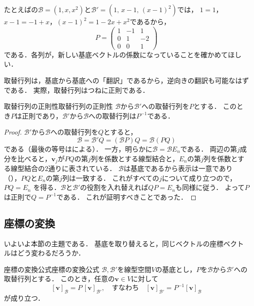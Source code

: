 たとえばの$\mathcal{B}=(1,x,x^2)$と$\mathcal{B}'=(1,\,x-1,\,(x-1)^2)$では，
$1=1$，$x-1=-1+x$，$(x-1)^2=1-2x+x^2$であるから，
\[
  P=\begin{pmatrix} 1 & -1 & 1 \\ 0 & 1 & -2 \\ 0 & 0 & 1 \end{pmatrix}
\]
である．各列が，新しい基底ベクトルの係数になっていることを確かめてほしい．

取替行列は，基底から基底への「翻訳」であるから，逆向きの翻訳も可能なはずである．
実際，取替行列はつねに正則である．

\begin{prop}{取替行列の正則性}{取替行列の正則性}
  $\mathcal{B}$から$\mathcal{B}'$への取替行列を$P$とする．
  このとき$P$は正則であり，$\mathcal{B}'$から$\mathcal{B}$への取替行列は$P^{-1}$である．
\end{prop}

\begin{tleftbar}
\begin{proof}
  $\mathcal{B}'$から$\mathcal{B}$への取替行列を$Q$とすると，
  \[
    \mathcal{B} = \mathcal{B}' Q = (\mathcal{B}P)Q = \mathcal{B}(PQ)
  \]
  である（最後の等号はによる）．
  一方，明らかに$\mathcal{B} = \mathcal{B}E_n$である．
  両辺の第$j$成分を比べると，$\bm{v}_j$が$PQ$の第$j$列を係数とする線型結合と，$E_n$の第$j$列を係数とする線型結合の$2$通りに表されている．
  $\mathcal{B}$は基底であるから表示は一意であり（），$PQ$と$E_n$の第$j$列は一致する．
  これがすべての$j$について成り立つので，
  $PQ = E_n$
  を得る．$\mathcal{B}$と$\mathcal{B}'$の役割を入れ替えれば$QP = E_n$も同様に従う．
  よって$P$は正則で$Q = P^{-1}$である．
  これが証明すべきことであった．
\end{proof}
\end{tleftbar}

\subsection{座標の変換}

いよいよ本節の主題である．
基底を取り替えると，同じベクトルの座標ベクトルはどう変わるだろうか．

\begin{theorem}{座標の変換公式}{座標の変換公式}
  $\mathcal{B},\mathcal{B}'$を線型空間$V$の基底とし，$P$を$\mathcal{B}$から$\mathcal{B}'$への取替行列とする．
  このとき，任意の$\bm{v} \in V$に対して
  \[
    [\bm{v}]_{\mathcal{B}} = P \, [\bm{v}]_{\mathcal{B}'},
    \quad \text{すなわち} \quad
    [\bm{v}]_{\mathcal{B}'} = P^{-1} [\bm{v}]_{\mathcal{B}}
  \]
  が成り立つ．
\end{theorem}

